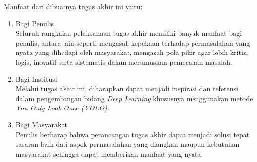 Manfaat dari dibuatnya tugas akhir ini yaitu:
\begin{enumerate} [nolistsep]
    \item Bagi Penulis\\
    Seluruh rangkaian pelaksanaan tugas akhir memiliki banyak manfaat bagi penulis, antara lain seperti mengasah kepekaan terhadap permasalahan yang nyata yang dihadapi oleh masyarakat, mengasah pola pikir agar lebih kritis, logis, inovatif serta sistematis dalam merumuskan pemecahan masalah.
    \item Bagi Institusi\\
    Melalui tugas akhir ini, diharapkan dapat menjadi inspirasi dan referensi dalam pengembangan bidang \textit{Deep Learning} khususnya menggunakan metode \textit{You Only Look Once (YOLO).}
    \item Bagi Masyarakat\\
    Penulis berharap bahwa perancangan tugas akhir dapat menjadi solusi tepat sasaran baik dari aspek permasalahan yang diangkan maupun kebutuhan masyarakat sehingga dapat memberikan manfaat yang nyata.
\end{enumerate}



















